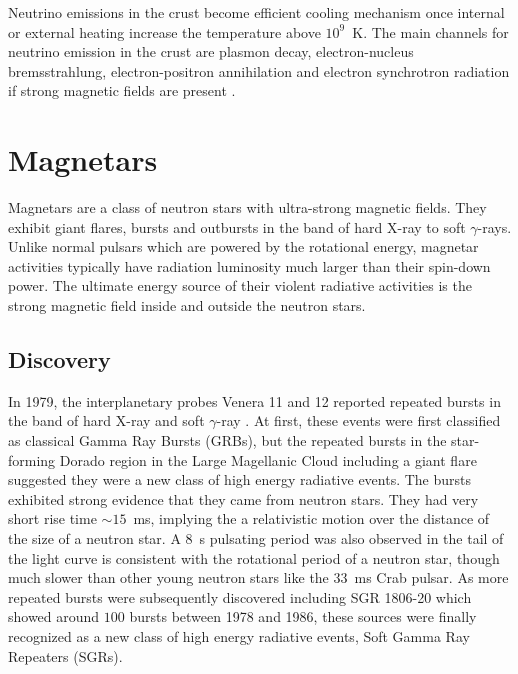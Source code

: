Neutrino emissions in the crust become efficient cooling mechanism once internal or external heating increase the temperature above $10^9$~K. 
The main channels for neutrino emission in the crust are plasmon decay, electron-nucleus bremsstrahlung, electron-positron annihilation and electron synchrotron radiation if strong magnetic fields are present \citep{2001PhR...354....1Y}.

\section{Magnetars}
\label{sec:intro-magnetars}

Magnetars are a class of neutron stars with ultra-strong magnetic fields. 
They exhibit giant flares, bursts and outbursts in the band of hard X-ray to soft $\gamma$-rays. 
Unlike normal pulsars which are powered by the rotational energy, magnetar activities typically have radiation luminosity much larger than their spin-down power.
The ultimate energy source of their violent radiative activities is the strong magnetic field inside and outside the neutron stars.

\subsection{Discovery}
\label{sec:intro-magnetar-discovery}

In 1979, the interplanetary probes Venera 11 and 12 reported repeated bursts in the band of hard X-ray and soft $\gamma$-ray \citep{1979SvAL....5...87M}.
At first, these events were first classified as classical Gamma Ray Bursts (GRBs), but the repeated bursts in the star-forming Dorado region in the Large Magellanic Cloud including a giant flare \citep{1979Natur.282..587M} suggested they were a new class of high energy radiative events. 
The bursts exhibited strong evidence that they came from neutron stars.
They had very short rise time $\sim 15$~ms, implying the a relativistic motion over the distance of the size of a neutron star.
A $8$~s pulsating period was also observed in the tail of the light curve is consistent with the rotational period of a neutron star, though much slower than other young neutron stars like the $33$~ms Crab pulsar.
As more repeated bursts were subsequently discovered including SGR 1806-20 \citep{1987ApJ...322L..21K,1987ApJ...320L.111L} which showed around $100$ bursts between 1978 and 1986, these sources were finally recognized as a new class of high energy radiative events, Soft Gamma Ray Repeaters (SGRs).

